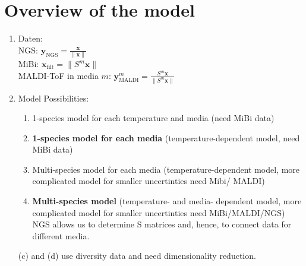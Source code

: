 \documentclass[10pt,A4paper]{article}
\begin{document}
\section{Overview of the model}
\begin{enumerate}
    \item Daten: \\
        NGS:  $ \mathbf{y}_\text{NGS} = \frac{\mathbf{x}}{\lVert \mathbf{x} \rVert}$\\
        MiBi: $ \mathbf{x}_\text{filt} = {\lVert S^m \mathbf{x} \rVert}$\\
        MALDI-ToF in media $m$: $ \mathbf{y}^m_\text{MALDI} = \frac{ S^m \mathbf{x}}{\lVert S^m \mathbf{x} \rVert}$\\
    \item Model Possibilities:
    \begin{enumerate}
        \item 1-species model for each temperature and media (need MiBi data)
        \item \textbf{1-species model for each media} (temperature-dependent model, need MiBi data)
        \item Multi-species model for each media (temperature-dependent model, more complicated model for smaller uncertinties need Mibi/ MALDI)
        \item \textbf{Multi-species model} (temperature- and media- dependent model, more complicated model for smaller uncertinties need MiBi/MALDI/NGS)
        NGS allows us to determine S matrices and, hence, to connect data for different media.
    \end{enumerate}
    (c) and (d) use diversity data and need dimensionality reduction.


\end{enumerate}
\end{document}
